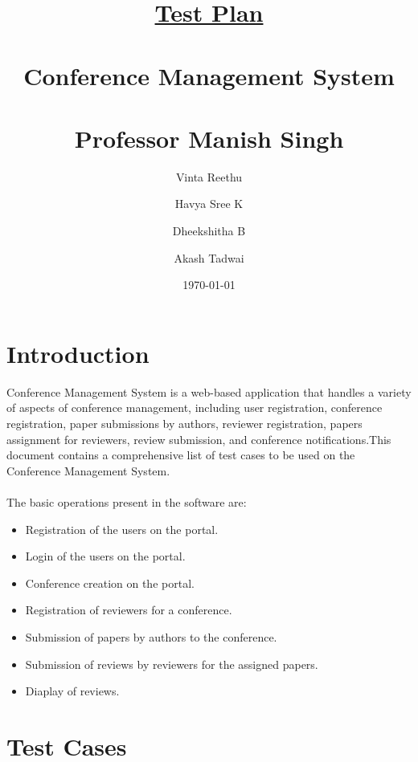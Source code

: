 \documentclass[english,a4paper,12pt]{report}
\title{\textbf{\underline{\Huge{Test Plan}}}\\~\\
\textbf{Conference Management System}\\~\\ 
Professor Manish Singh\\
}
\author{Vinta Reethu \and Havya Sree K \and Dheekshitha B \and Akash Tadwai }
\date{\today}
\begin{document}
\titleformat{\chapter}[display]   
{\normalfont\huge\bfseries}{\chaptertitlename\ \thechapter}{20pt}{\Huge}   
\titlespacing*{\chapter}{0pt}{-10pt}{40pt}
\maketitle

\newpage

\tableofcontents

\newpage
\chapter{Introduction}
Conference Management System is a web-based application that handles a variety of aspects of conference management, including user registration, conference registration, paper submissions by authors,
reviewer registration, papers assignment for reviewers, review submission, and conference notifications.This document contains a comprehensive list of test cases to be used on the Conference Management System.\\\\
The basic operations present in the software are:
\begin{itemize}
    \item Registration of the users on the portal.
    \item Login of the users on the portal.
    \item Conference creation on the portal.
    \item Registration of reviewers for a conference.
    \item Submission of papers by authors to the conference.
    \item Submission of reviews by reviewers for the assigned papers.
    \item Diaplay of reviews.
\end{itemize}

\chapter{Test Cases}
\end{document}
